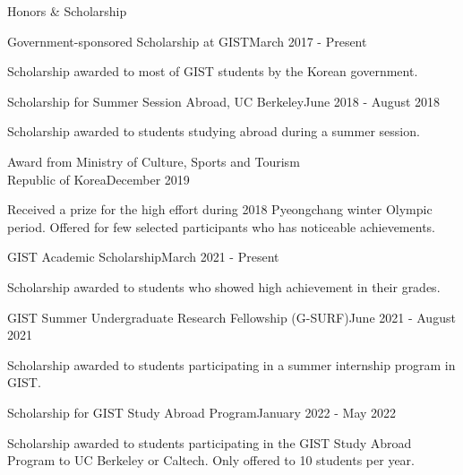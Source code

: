\documentclass{resume} %
\begin{document}
\begin{rSection}{Honors \& Scholarship} \itemsep -5pt
\begin{rSubsection}{Government-sponsored Scholarship at GIST}{March 2017 - Present}{}{}
\item Scholarship awarded to most of GIST students by the Korean government.
\end{rSubsection}

\begin{rSubsection}{Scholarship for Summer Session Abroad, UC Berkeley}{June 2018 - August 2018}{}{}
\item Scholarship awarded to students studying abroad during a summer session.
\end{rSubsection}

\begin{rSubsection}{Award from Ministry of Culture, Sports and Tourism \\ Republic of Korea}{December 2019}{}{}
\item Received a prize for the high effort during 2018 Pyeongchang winter Olympic period. Offered for few selected participants who has noticeable achievements.
\end{rSubsection}

\begin{rSubsection}{GIST Academic Scholarship}{March 2021 - Present}{}{}
\item Scholarship awarded to students who showed high achievement in their grades.
\end{rSubsection}

\begin{rSubsection}{GIST Summer Undergraduate Research Fellowship (G-SURF)}{June 2021 - August 2021}{}{}
\item Scholarship awarded to students participating in a summer internship program in GIST.
\end{rSubsection}

\begin{rSubsection}{Scholarship for GIST Study Abroad Program}{January 2022 - May 2022}{}{}
\item Scholarship awarded to students participating in the GIST Study Abroad Program to UC Berkeley or Caltech. Only offered to 10 students per year.
\end{rSubsection}


\end{rSection}
\end{document}
